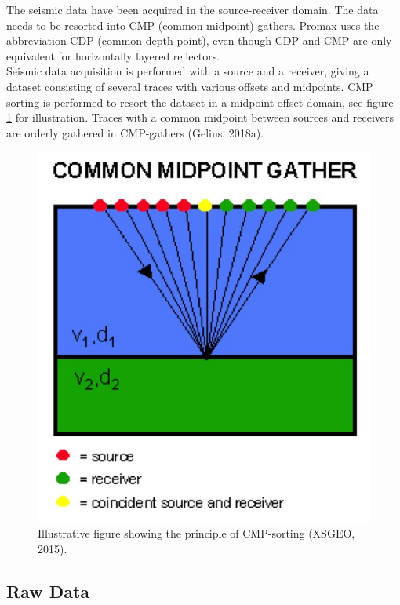 \documentclass[10pt,a4paper]{article}
\begin{document}
The seismic data have been acquired in the source-receiver domain. The data needs to be resorted into CMP (common midpoint) gathers. Promax uses the abbreviation CDP (common depth point), even though CDP and CMP are only equivalent for horizontally layered reflectors.
\\
\noindent Seismic data acquisition is performed with a source and a receiver, giving a dataset consisting of several traces with various offsets and midpoints. CMP sorting is performed to resort the dataset in a midpoint-offset-domain, see figure \ref{fig1} for illustration. Traces with a common midpoint between sources and receivers are orderly gathered in CMP-gathers (Gelius, 2018a).


\begin{figure}[H]
\centering
\includegraphics[scale=0.4]{fig1.jpg}
\caption{Illustrative figure showing the principle of CMP-sorting (XSGEO, 2015).}
\label{fig1}
\end{figure}

\subsection{Raw Data}
\end{document}
